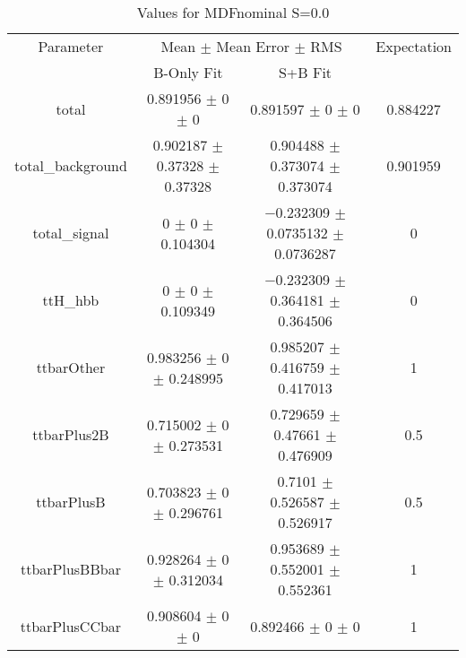 \begin{table}
\centering
\caption{Values for MDFnominal S=0.0}
\begin{tabular}{cccc}
\toprule
Parameter & \multicolumn{2}{c}{Mean $\pm$ Mean Error $\pm$ RMS} & Expectation\\
 & B-Only Fit & S+B Fit & \\
\midrule
total & \num{0.891956} $\pm$ \num{0} $\pm$ \num{0} & \num{0.891597} $\pm$ \num{0} $\pm$ \num{0} & \num{0.884227}\\
total\_background & \num{0.902187} $\pm$ \num{0.37328} $\pm$ \num{0.37328} & \num{0.904488} $\pm$ \num{0.373074} $\pm$ \num{0.373074} & \num{0.901959}\\
total\_signal & \num{0} $\pm$ \num{0} $\pm$ \num{0.104304} & \num{-0.232309} $\pm$ \num{0.0735132} $\pm$ \num{0.0736287} & \num{0}\\
ttH\_hbb & \num{0} $\pm$ \num{0} $\pm$ \num{0.109349} & \num{-0.232309} $\pm$ \num{0.364181} $\pm$ \num{0.364506} & \num{0}\\
ttbarOther & \num{0.983256} $\pm$ \num{0} $\pm$ \num{0.248995} & \num{0.985207} $\pm$ \num{0.416759} $\pm$ \num{0.417013} & \num{1}\\
ttbarPlus2B & \num{0.715002} $\pm$ \num{0} $\pm$ \num{0.273531} & \num{0.729659} $\pm$ \num{0.47661} $\pm$ \num{0.476909} & \num{0.5}\\
ttbarPlusB & \num{0.703823} $\pm$ \num{0} $\pm$ \num{0.296761} & \num{0.7101} $\pm$ \num{0.526587} $\pm$ \num{0.526917} & \num{0.5}\\
ttbarPlusBBbar & \num{0.928264} $\pm$ \num{0} $\pm$ \num{0.312034} & \num{0.953689} $\pm$ \num{0.552001} $\pm$ \num{0.552361} & \num{1}\\
ttbarPlusCCbar & \num{0.908604} $\pm$ \num{0} $\pm$ \num{0} & \num{0.892466} $\pm$ \num{0} $\pm$ \num{0} & \num{1}\\
\bottomrule
\end{tabular}
\end{table}